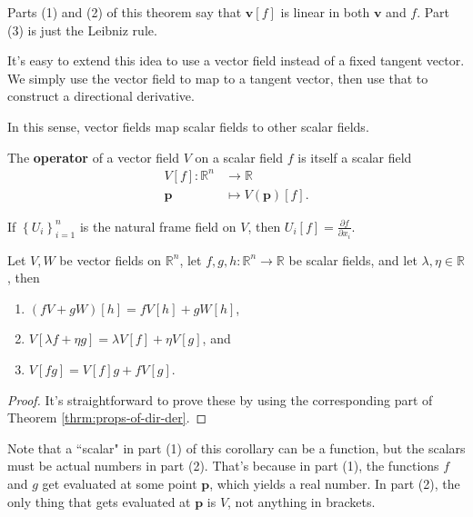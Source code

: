 \documentclass[10pt]{report}
\begin{document}
Parts (1) and (2) of this theorem say that $\mathbf{v}[f]$ is linear in both $\mathbf{v}$ and $f$. Part (3) is just the Leibniz rule.

It's easy to extend this idea to use a vector field instead of a fixed tangent vector. We simply use the vector field to map to a tangent vector, then use that to construct a directional derivative.

\begin{note}
In this sense, vector fields map scalar fields to other scalar fields.
\end{note}

\begin{defn}
	The \textbf{operator} of a vector field $V$ on a scalar field $f$ is itself a scalar field
	\begin{align*}
		V[f]: \mathbb{R}^n &\to \mathbb{R} \\
		\mathbf{p} &\mapsto V(\mathbf{p})[f].
	\end{align*}
\end{defn}

\begin{ex}
If $\left\{ U_i \right\}_{i=1}^n$ is the natural frame field on $V$, then $U_i[f] = \frac{\partial f}{\partial x_i} .$
\end{ex}

\begin{cor}
	Let $V,W$ be vector fields on $\mathbb{R}^n$, let $f,g,h:\mathbb{R}^n \to \mathbb{R}$ be scalar fields, and let $\lambda,\eta \in \mathbb{R}$, then
	\begin{enumerate}
		\item $(fV+gW)[h] = fV[h] + gW[h]$,
		\item $V[\lambda f+\eta g] = \lambda V[f] + \eta V[g]$, and
		\item $V[fg] = V[f] g + f V[g]$.
	\end{enumerate}
\end{cor}
\begin{proof}
	It's straightforward to prove these by using the corresponding part of Theorem \ref{thrm:props-of-dir-der}.
\end{proof}

Note that a ``scalar" in part (1) of this corollary can be a function, but the scalars must be actual numbers in part (2). That's because in part (1), the functions $f$ and $g$ get evaluated at some point $\mathbf{p}$, which yields a real number. In part (2), the only thing that gets evaluated at $\mathbf{p}$ is $V$, not anything in brackets.
\end{document}
